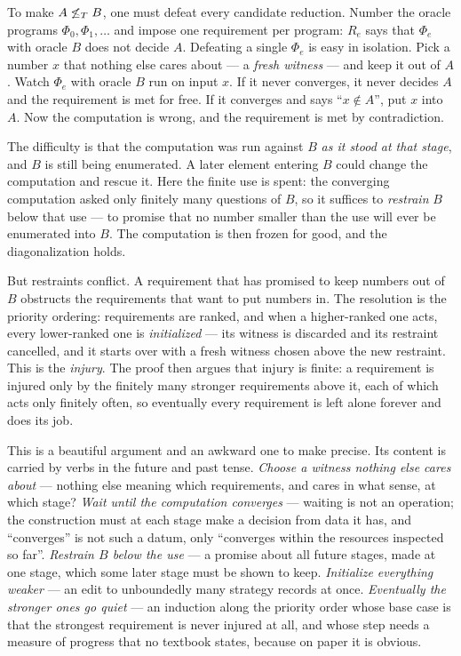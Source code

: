 To make $A \not\leq_T B$, one must defeat every candidate reduction.  Number
the oracle programs $\Phi_0, \Phi_1, \dots$ and impose one requirement per
program: $R_e$ says that $\Phi_e$ with oracle $B$ does not decide $A$.
Defeating a single $\Phi_e$ is easy in isolation.  Pick a number $x$ that
nothing else cares about --- a \emph{fresh witness} --- and keep it out of
$A$.  Watch $\Phi_e$ with oracle $B$ run on input $x$.  If it never
converges, it never decides $A$ and the requirement is met for free.  If it
converges and says ``$x \notin A$'', put $x$ into $A$.  Now the computation
is wrong, and the requirement is met by contradiction.

The difficulty is that the computation was run against $B$ \emph{as it
stood at that stage}, and $B$ is still being enumerated.  A later element
entering $B$ could change the computation and rescue it.  Here the finite
use is spent: the converging computation asked only finitely many questions
of $B$, so it suffices to \emph{restrain} $B$ below that use --- to promise
that no number smaller than the use will ever be enumerated into $B$.  The
computation is then frozen for good, and the diagonalization holds.

But restraints conflict.  A requirement that has promised to keep numbers
out of $B$ obstructs the requirements that want to put numbers in.  The
resolution is the priority ordering: requirements are ranked, and when a
higher-ranked one acts, every lower-ranked one is \emph{initialized} ---
its witness is discarded and its restraint cancelled, and it starts over
with a fresh witness chosen above the new restraint.  This is the
\emph{injury}.  The proof then argues that injury is finite: a requirement
is injured only by the finitely many stronger requirements above it, each
of which acts only finitely often, so eventually every requirement is left
alone forever and does its job.

This is a beautiful argument and an awkward one to make precise.  Its
content is carried by verbs in the future and past tense.  \emph{Choose a
witness nothing else cares about} --- nothing else meaning which
requirements, and cares in what sense, at which stage?  \emph{Wait until
the computation converges} --- waiting is not an operation; the
construction must at each stage make a decision from data it has, and
``converges'' is not such a datum, only ``converges within the resources
inspected so far''.  \emph{Restrain $B$ below the use} --- a promise about
all future stages, made at one stage, which some later stage must be shown
to keep.  \emph{Initialize everything weaker} --- an edit to unboundedly
many strategy records at once.  \emph{Eventually the stronger ones go
quiet} --- an induction along the priority order whose base case is that
the strongest requirement is never injured at all, and whose step needs a
measure of progress that no textbook states, because on paper it is
obvious.

